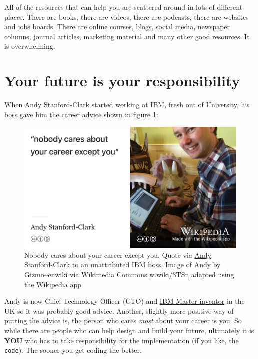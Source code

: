 \documentclass[
]{book}
\begin{document}
All of the resources that can help you are scattered around in lots of different places. There are books, there are videos, there are podcasts, there are websites and jobs boards. There are online courses, blogs, social media, newspaper columns, journal articles, marketing material and many other good resources. It is overwhelming.

\hypertarget{responsibility}{%
\section{Your future is your responsibility}\label{responsibility}}

When Andy Stanford-Clark started working at IBM, fresh out of University, his boss gave him the career advice shown in figure \ref{fig:andysc-fig}:

\begin{figure}

{\centering \includegraphics[width=0.99\linewidth]{images/nobody-cares-about-your-career-except-you} 

}

\caption{Nobody cares about your career except you. Quote via \href{https://en.wikipedia.org/wiki/Andy_Stanford-Clark}{Andy Stanford-Clark} \citep{andystanfordclark} to an unattributed IBM boss. Image of Andy by Gizmo\textasciitilde enwiki via Wikimedia Commons \href{https://w.wiki/3TSn}{w.wiki/3TSn} adapted using the Wikipedia app}\label{fig:andysc-fig}
\end{figure}



Andy is now Chief Technology Officer (CTO) and \href{https://en.wikipedia.org/wiki/IBM_Master_Inventor}{IBM Master inventor} in the UK so it was probably good advice. Another, slightly more positive way of putting the advice is, the person who cares \emph{most} about your career is you. So while there are people who can help design and build your future, ultimately it is \textbf{YOU} who has to take responsibility for the implementation (if you like, the \texttt{code}). The sooner you get coding the better.
\end{document}
